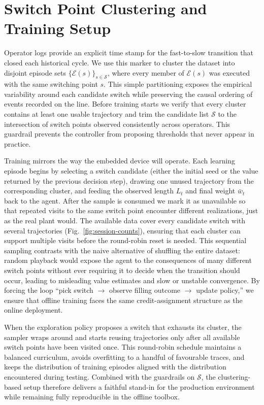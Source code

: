 \documentclass[journal]{IEEEtranTIE}
\begin{document}
\section{Switch Point Clustering and Training Setup}
Operator logs provide an explicit time stamp for the fast-to-slow transition that closed each historical cycle. We use this marker to cluster the dataset into disjoint episode sets $\{\mathcal{E}(s)\}_{s\in\mathcal{S}}$, where every member of $\mathcal{E}(s)$ was executed with the same switching point $s$. This simple partitioning exposes the empirical variability around each candidate switch while preserving the causal ordering of events recorded on the line. Before training starts we verify that every cluster contains at least one usable trajectory and trim the candidate list $\mathcal{S}$ to the intersection of switch points observed consistently across operators. This guardrail prevents the controller from proposing thresholds that never appear in practice.

Training mirrors the way the embedded device will operate. Each learning episode begins by selecting a switch candidate (either the initial seed or the value returned by the previous decision step), drawing one unused trajectory from the corresponding cluster, and feeding the observed length $L_t$ and final weight $\bar{w}_t$ back to the agent. After the sample is consumed we mark it as unavailable so that repeated visits to the same switch point encounter different realizations, just as the real plant would. The available data cover every candidate switch with several trajectories (Fig.~\ref{fig:session-counts}), ensuring that each cluster can support multiple visits before the round-robin reset is needed. This sequential sampling contrasts with the naive alternative of shuffling the entire dataset: random playback would expose the agent to the consequences of many different switch points without ever requiring it to decide when the transition should occur, leading to misleading value estimates and slow or unstable convergence. By forcing the loop “pick switch $\rightarrow$ observe filling outcome $\rightarrow$ update policy,” we ensure that offline training faces the same credit-assignment structure as the online deployment.

When the exploration policy proposes a switch that exhausts its cluster, the sampler wraps around and starts reusing trajectories only after all available switch points have been visited once. This round-robin schedule maintains a balanced curriculum, avoids overfitting to a handful of favourable traces, and keeps the distribution of training episodes aligned with the distribution encountered during testing. Combined with the guardrails on $\mathcal{S}$, the clustering-based setup therefore delivers a faithful stand-in for the production environment while remaining fully reproducible in the offline toolbox.
\end{document}
